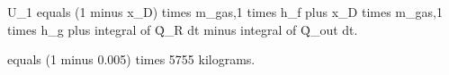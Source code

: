 U_1 equals (1 minus x_D) times m_gas,1 times h_f plus x_D times m_gas,1 times h_g plus integral of Q̇_R dt minus integral of Q̇_out dt.  

equals (1 minus 0.005) times 5755 kilograms.